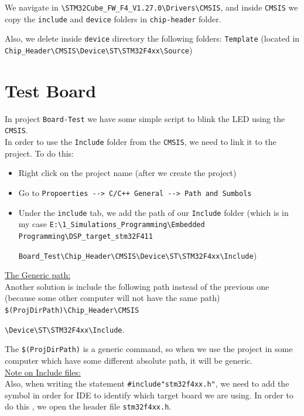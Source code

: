 \documentclass[12pt,a4paper]{book}
\begin{document}
We navigate in \verb|\STM32Cube_FW_F4_V1.27.0\Drivers\CMSIS|, and inside \verb|CMSIS| we copy the \verb|include| and \verb|device| folders in \verb|chip-header| folder. 

Also, we delete inside \verb|device| directory the following folders: \verb|Template| (located in \verb|Chip_Header\CMSIS\Device\ST\STM32F4xx\Source|)

\section{Test Board}

In project \verb|Board-Test| we have some simple script to blink the LED using the \verb|CMSIS|.\\

In order to use the \verb|Include| folder from the \verb|CMSIS|, we need to link it to the project. To do this:

\begin{itemize}
    \item Right click on the project name (after we create the project)

    \item  Go to \verb|Propoerties --> C/C++ General --> Path and Sumbols|

    \item  Under the \verb|include| tab, we add the path of our \verb|Include| folder (which is in my case \verb|E:\1_Simulations_Programming\Embedded Programming\DSP_target_stm32F411|
    
    \verb|Board_Test\Chip_Header\CMSIS\Device\ST\STM32F4xx\Include|)
\end{itemize}

\underline{The Generic path:}\\

Another solution is include the following path instead of the previous one (because some other computer will not have the same path) \verb|$(ProjDirPath)\Chip_Header\CMSIS|

\verb|\Device\ST\STM32F4xx\Include|.

The \verb|$(ProjDirPath)| is a generic command, so when we use the project in some computer which have some different absolute path, it will be generic.\\

\underline{Note on Include files:}\\

Also, when writing the statement \verb|#include"stm32f4xx.h"|, we need to add the symbol in order for IDE to identify which target board we are using. In order to do this , we open the header file \verb|stm32f4xx.h|.\\
\end{document}
